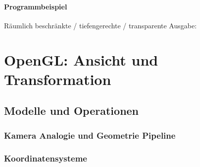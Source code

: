 \documentclass{scrreprt}
\begin{document}
\subsubsection*{Programmbeispiel}
Räumlich beschränkte / tiefengerechte / transparente Ausgabe:

\chapter{OpenGL: Ansicht und Transformation}

\section{Modelle und Operationen}

\subsection{Kamera Analogie und Geometrie Pipeline}
\subsection{Koordinatensysteme}
\end{document}
